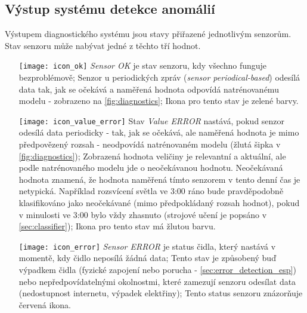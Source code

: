 \subsection*{Výstup systému detekce anomálií} \label{subsec:diagnostics_output}
Výstupem diagnostického systému jsou stavy přiřazené jednotlivým senzorům. Stav senzoru může nabývat jedné z těchto tří hodnot.

\begin{itemize}
  \item [{\texttt{[image: icon\_ok]}}] \textit{Sensor OK} je stav senzoru, kdy všechno funguje bezproblémově; Senzor u periodických zpráv (\textit{sensor periodical-based}) odesílá data tak, jak se očekává a naměřená hodnota odpovídá natrénovanému modelu - zobrazeno na \cref{fig:diagnostics}; Ikona pro tento stav je zelené barvy.
  \item [{\texttt{[image: icon\_value\_error]}}] Stav \textit{Value ERROR} nastává, pokud senzor odesílá data periodicky - tak, jak se očekává, ale naměřená hodnota je mimo předpovězený rozsah - neodpovídá natrénovaném modelu (žlutá šipka v \cref{fig:diagnostics}); Zobrazená hodnota veličiny je relevantní a aktuální, ale podle natrénovaného modelu jde o neočekávanou hodnotu. Neočekávaná hodnota znamená, že  hodnota naměřená tímto senzorem v tento denní čas je netypická. Například rozsvícení světla ve 3:00 ráno bude pravděpodobně klasifikováno jako neočekávané (mimo předpokládaný rozsah hodnot), pokud v minulosti ve 3:00 bylo vždy zhasnuto (strojové učení je popsáno v \cref{sec:classifier}); Ikona pro tento stav má žlutou barvu.
  \item [{\texttt{[image: icon\_error]}}] \textit{Sensor ERROR} je status čidla, který nastává v momentě, kdy čidlo neposílá žádná data; Tento stav je způsobený buď výpadkem čidla (fyzické zapojení nebo porucha - \cref{sec:error_detection_esp}) nebo nepředpovídatelnými okolnostmi, které zamezují senzoru odesílat data (nedostupnost internetu, výpadek elektřiny); Tento status senzoru znázorňuje červená ikona.
\end{itemize}


